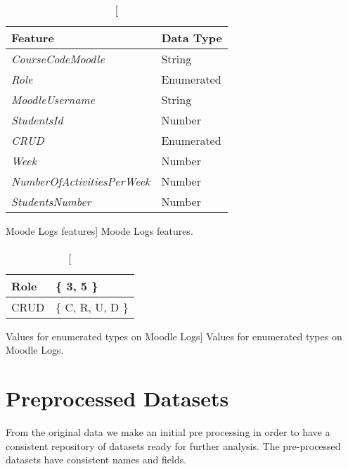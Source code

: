 \begin{table}[h!]
    \centering

    \begin{tabular}{l l}
        Feature                            & Data Type  \\ \hline
        \textit{CourseCodeMoodle}          & String     \\
        \textit{Role}                      & Enumerated \\
        \textit{MoodleUsername}            & String     \\
        \textit{StudentsId}                & Number     \\
        \textit{CRUD}                      & Enumerated \\
        \textit{Week}                      & Number     \\
        \textit{NumberOfActivitiesPerWeek} & Number     \\
        \textit{StudentsNumber}            & Number     \\
    \end{tabular}

    \caption
        [Moode Logs features]
        {Moode Logs features.}

    \label{tab:moodle_logs_features}
\end{table}

\begin{table}[h!]
    \centering

    \begin{tabular}{| l | l |}
        \hline
        Role & \{ 3, 5 \} \\ \hline
        CRUD & \{ C, R, U, D \}  \\ \hline
    \end{tabular}

    \caption
        [Values for enumerated types on Moodle Logs]
        {Values for enumerated types on Moodle Logs.}

    \label{tab:moodle_logs_enum}
\end{table}

\section{Preprocessed Datasets}

From the original data we make an initial pre processing in order to have a
consistent repository of datasets ready for further analysis. The pre-processed
datasets have consistent names and fields.

